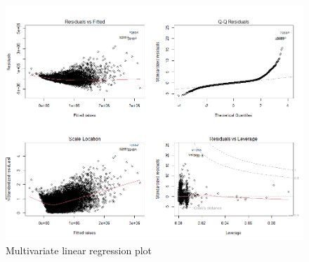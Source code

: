 \documentclass[a4paper, 11pt]{article}
\begin{document}
\begin{figure}[H]
\includegraphics[scale=0.45]{MLR}
\centering
\caption{Multivariate linear regression plot}
\label{fig:MLR}
\end{figure}
\end{document}
